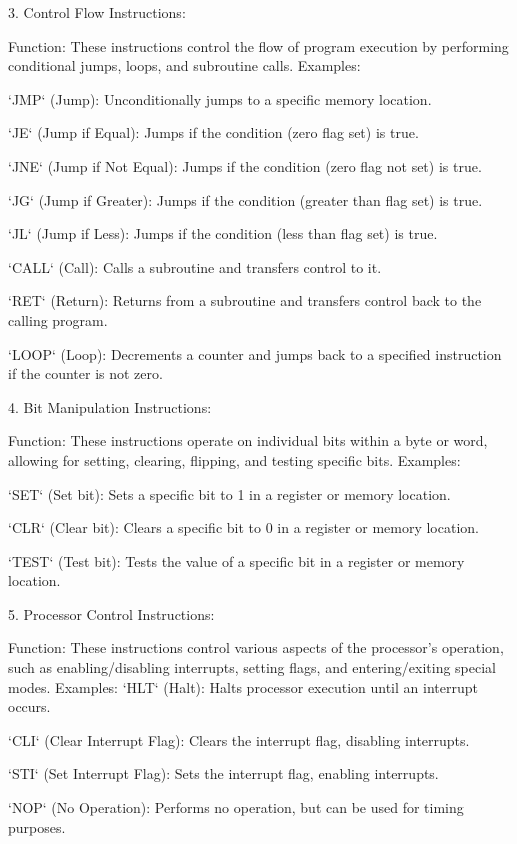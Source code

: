 \documentclass[article]{article}
\begin{document}
{3. Control Flow Instructions:

Function: These instructions control the flow of program execution by performing conditional jumps, loops, and subroutine calls.
Examples:
    
    `JMP` (Jump): Unconditionally jumps to a specific memory location.
    
    `JE` (Jump if Equal): Jumps if the condition (zero flag set) is true.
    
    `JNE` (Jump if Not Equal): Jumps if the condition (zero flag not set) is true.
    
    `JG` (Jump if Greater): Jumps if the condition (greater than flag set) is true.
    
    `JL` (Jump if Less): Jumps if the condition (less than flag set) is true.
    
    `CALL` (Call): Calls a subroutine and transfers control to it.
    
    `RET` (Return): Returns from a subroutine and transfers control back to the calling program.
    
    `LOOP` (Loop): Decrements a counter and jumps back to a specified instruction if the counter is not zero.


4. Bit Manipulation Instructions:

Function: These instructions operate on individual bits within a byte or word, allowing for setting, clearing, flipping, and testing specific bits.
Examples:
    
    `SET` (Set bit): Sets a specific bit to 1 in a register or memory location.
    
    `CLR` (Clear bit): Clears a specific bit to 0 in a register or memory location.
    
    `TEST` (Test bit): Tests the value of a specific bit in a register or memory location.


5. Processor Control Instructions:

Function: These instructions control various aspects of the processor's operation, such as enabling/disabling interrupts, setting flags, and entering/exiting special modes.
Examples:
     `HLT` (Halt): Halts processor execution until an interrupt occurs.
    
    `CLI` (Clear Interrupt Flag): Clears the interrupt flag, disabling interrupts.
    
    `STI` (Set Interrupt Flag): Sets the interrupt flag, enabling interrupts.
    
    `NOP` (No Operation): Performs no operation, but can be used for timing purposes.
}
\newpage
\end{document}

